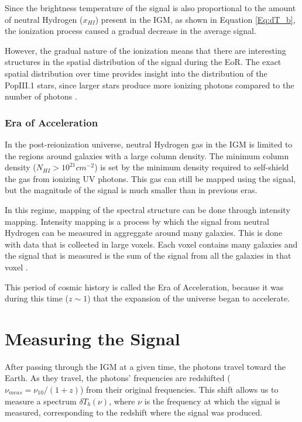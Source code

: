 Since the brightness temperature of the \cm signal is also proportional to the amount of neutral Hydrogen ($x_{HI}$) present in the IGM, as shown in Equation \ref{Eq:dT_b}, the ionization process caused a gradual decrease in the average \cm signal. 

However, the gradual nature of the ionization means that there are interesting structures in the spatial distribution of the \cm signal during the EoR. The exact spatial distribution over time provides insight into the distribution of the PopIII.1 stars, since larger stars produce more ionizing photons compared to the number of \lya  photons \cite{furlanetto_2006}. 

\subsubsection{Era of Acceleration}

In the post-reionization universe, neutral Hydrogen gas in the IGM is limited to the regions around galaxies with a large column density. The minimum column density ($N_{HI}>10^{21} cm^{-2}$) is set by the minimum density required to self-shield the gas from ionizing UV photons. This gas can still be mapped using the \cm signal, but the magnitude of the signal is much smaller than in previous eras. 

In this regime, mapping of the spectral structure can be done through intensity mapping. Intensity mapping is a process by which the signal from neutral Hydrogen can be measured in aggreggate around many galaxies. This is done with data that is collected in large voxels. Each voxel contains many galaxies and the \cm signal that is measured is the sum of the \cm signal from all the galaxies in that voxel \cite{masui_2012}.

This period of cosmic history is called the Era of Acceleration, because it was during this time ($z \sim 1$) that the expansion of the universe began to accelerate. 

\section{Measuring the \cm Signal}

After passing through the IGM at a given time, the \cm photons travel toward the Earth. As they travel, the photons' frequencies are redshifted ($\nu_{meas} = \nu_{10}/(1+z)$) from their original frequencies. This shift allows us to measure a spectrum $\delta T_b (\nu)$, where $\nu$ is the frequency at which the signal is measured, corresponding to the redshift where the signal was produced. 

